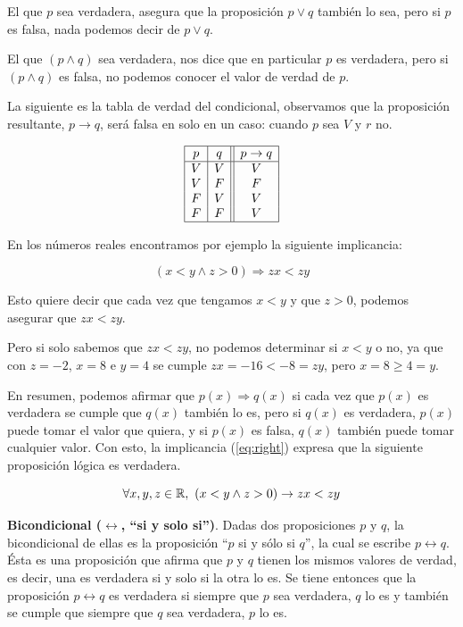 El que $p$ sea verdadera, asegura que la proposición $p\vee q$ también lo sea, pero si $p$ es falsa, nada podemos decir de $p\vee q$.

El que $(p\wedge q)$ sea verdadera, nos dice que en particular $p$ es verdadera, pero si $(p\wedge q)$ es falsa, no podemos conocer el valor de verdad de $p$.

\medskip


\medskip

La siguiente es la tabla de verdad del condicional, observamos que la 
proposición resultante, $p\rightarrow q$, será falsa en solo en un caso: cuando
$p$ sea $V$ y $r$ no.

$$\begin{array}{|c|c||c|}
	\hline
	p& q& p\rightarrow q \cr
	\hline
	V&V&V\cr
	V&F&F\cr
	F&V&V\cr
	F&F&V\cr
	\hline
\end{array}$$

\begin{ejemplo}
En los números reales encontramos por ejemplo la siguiente implicancia:

\begin{equation}\label{eq:right}
( x<y \wedge z>0 )\Rightarrow zx<zy
\end{equation}

Esto quiere decir que cada vez que tengamos $x<y$ y que $z>0$, podemos asegurar que $zx<zy$.

Pero si solo sabemos que $zx<zy$, no podemos determinar si $x<y$ o no, ya que con $z=-2$, $x=8$ e $y=4$ se cumple $zx=-16<-8=zy$, pero $x=8\ge 4=y$.

En resumen, podemos afirmar que $p(x)\Rightarrow q(x)$ si cada vez que $p(x)$ es verdadera se cumple que $q(x)$ también lo es, pero si $q(x)$ es verdadera, $p(x)$ puede tomar el valor que quiera, y si $p(x)$ es falsa, $q(x)$ también puede tomar cualquier valor.
Con esto, la implicancia (\ref{eq:right}) expresa que la siguiente proposición lógica es verdadera.

$$\forall x,y,z\in \mathbb{R},\ ( x<y \wedge z>0 )\rightarrow zx<zy$$
\end{ejemplo}

\medskip 

\textbf{Bicondicional ($\leftrightarrow$, ``si y solo si'')}.
Dadas dos proposiciones $ p$ y $ q$, la bicondicional de 
ellas es la proposici\'on ``$p$ si y s\'olo si $ q$'', 
la cual se escribe $ p\leftrightarrow q$.
\'Esta es una proposici\'on que afirma que $p$ y $q$ tienen los mismos valores
de verdad, es decir, una es verdadera si y solo si la otra lo es.
Se tiene entonces que la proposici\'on
$p \leftrightarrow q$ es verdadera si siempre que $p$ sea verdadera, $q$ lo es
y tambi\'en se cumple que siempre que $q$ sea verdadera, $p$ lo es.

